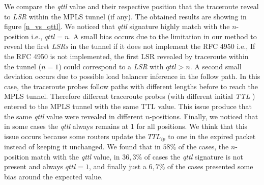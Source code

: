 We compare the \textit{qttl} value and their respective position that the traceroute reveal to \textit{LSR} within the MPLS tunnel (if any). The obtained results are showing in figure \ref{n_vs_qttl}. We noticed that \textit{qttl} signature highly match with the $n$-position i.e., $qttl=n$.  A small bias occurs due to the limitation in our method to reveal the first \textit{LSRs} in the tunnel if it does not implement the RFC 4950 i.e., If the RFC 4950 is not implemented, the first LSR revealed by traceroute within the tunnel  ($n=1$) could correspond to a \textit{LSR} with $qttl>n$. A second small deviation occurs due to possible load balancer inference in the follow path. In this case, the traceroute probes follow paths with different lengths before to reach the MPLS tunnel. Therefore different traceroute probes (with different initial \textit{TTL} ) entered to the MPLS tunnel with the same TTL value. This issue produce that the same \textit{qttl} value were revealed in different $n$-positions. Finally, we noticed that in some cases the \textit{qttl} always remains at 1 for all positions. We think that this issue occurs because some routers update the $TTL_{ip}$ to one in the expired packet instead of keeping it unchanged. We found that in $58\%$ of the cases, the $n$-position match with the \textit{qttl} value, in $36,3\%$ of cases the \textit{qttl} signature is not present and always $qttl=1$, and finally just a $6,7\%$ of the cases presented some bias around the expected value.

